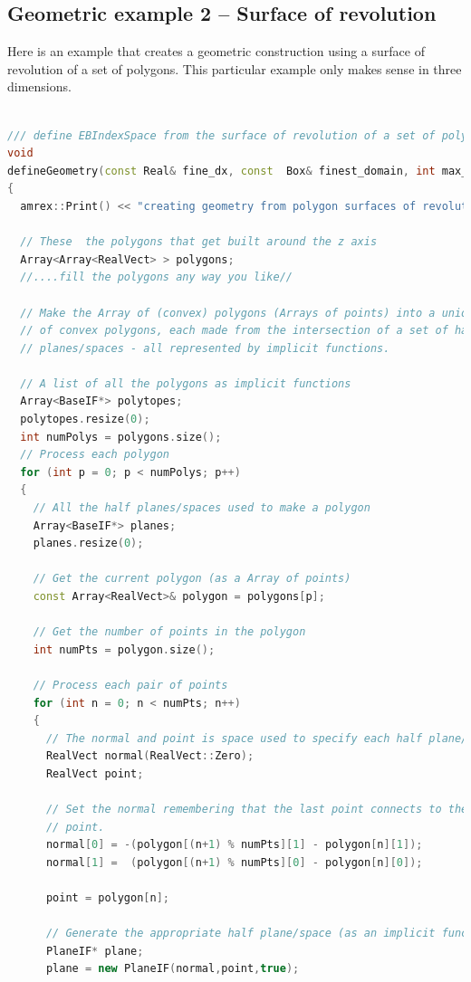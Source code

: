\subsection{Geometric example 2 -- Surface of revolution}

Here is an example that creates a geometric construction using a
surface of revolution of a set of polygons.   This particular example
only makes sense in three dimensions.

\begin{lstlisting}[language=cpp]

/// define EBIndexSpace from the surface of revolution of a set of polygons
void
defineGeometry(const Real& fine_dx, const  Box& finest_domain, int max_grid_size)
{
  amrex::Print() << "creating geometry from polygon surfaces of revolution" << endl;

  // These  the polygons that get built around the z axis
  Array<Array<RealVect> > polygons;
  //....fill the polygons any way you like//

  // Make the Array of (convex) polygons (Arrays of points) into a union
  // of convex polygons, each made from the intersection of a set of half
  // planes/spaces - all represented by implicit functions.

  // A list of all the polygons as implicit functions
  Array<BaseIF*> polytopes;
  polytopes.resize(0);
  int numPolys = polygons.size();
  // Process each polygon
  for (int p = 0; p < numPolys; p++)
  {
    // All the half planes/spaces used to make a polygon
    Array<BaseIF*> planes;
    planes.resize(0);

    // Get the current polygon (as a Array of points)
    const Array<RealVect>& polygon = polygons[p];

    // Get the number of points in the polygon
    int numPts = polygon.size();

    // Process each pair of points
    for (int n = 0; n < numPts; n++)
    {
      // The normal and point is space used to specify each half plane/space
      RealVect normal(RealVect::Zero);
      RealVect point;

      // Set the normal remembering that the last point connects to the first
      // point.
      normal[0] = -(polygon[(n+1) % numPts][1] - polygon[n][1]);
      normal[1] =  (polygon[(n+1) % numPts][0] - polygon[n][0]);

      point = polygon[n];

      // Generate the appropriate half plane/space (as an implicit function)
      PlaneIF* plane;
      plane = new PlaneIF(normal,point,true);


\end{lstlisting}
